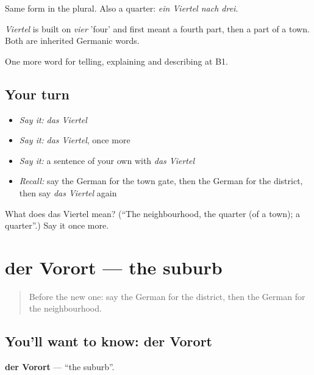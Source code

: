 Same form in the plural. Also a quarter: \emph{ein Viertel nach drei}.

\begin{cousinweb}
\emph{Viertel} is built on \emph{vier} 'four' and first meant a fourth part, then a part of a town. Both are inherited Germanic words.
\end{cousinweb}

\begin{grammarlens}[title={What you've built}]
One more word for telling, explaining and describing at B1.
\end{grammarlens}

\subsection*{Your turn}
\begin{itemize}
\raggedright
  \item \emph{Say it:} \emph{das Viertel}
  \item \emph{Say it:} \emph{das Viertel}, once more
  \item \emph{Say it:} a sentence of your own with \emph{das Viertel}
  \item \emph{Recall:} say the German for the town gate, then the German for the district, then say \emph{das Viertel} again
\end{itemize}

\begin{tcolorbox}[breakable,colback=teal!4,colframe=teal!35!black,title={Before you move on}]
What does das Viertel mean? (\textquotedblleft{}The neighbourhood, the quarter (of a town); a quarter\textquotedblright{}.) Say it once more.
\end{tcolorbox}
\section[der Vorort]{der Vorort — the suburb}

\label{lesson:GE-C439-vorort}



\begin{quote}
Before the new one: say the German for the district, then the German for the neighbourhood.
\end{quote}

\subsection*{You'll want to know: der Vorort}
\textbf{der Vorort} — \textquotedblleft{}the suburb\textquotedblright{}.

